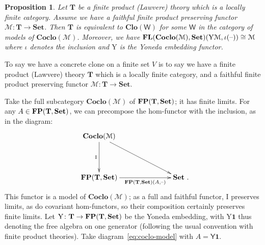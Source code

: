 \documentclass[11pt, a4paper, twoside,leqno]{amsart}
\newcommand{\cat}[1]{\mathbf{#1}}
\newcommand{\thg}{{\mathord{\text{--}}}}
\newcommand{\defeq}{\mathrel{\mathop:}=}
\newcommand{\cd}[2][]{\vcenter{\hbox{\xymatrix#1{#2}}}}
\numberwithin{equation}{section}
\theoremstyle{plain}
\newtheorem{Prop}[Thm]{Proposition}
\theoremstyle{definition}
\newcommand{\Set}{\cat{Set}}
\newcommand{\aone}{{\mathbf 1}}
\DeclareMathOperator{\FP}{\bf FP}
\DeclareMathOperator{\FL}{\bf FL}
\begin{document}
\begin{Prop}
  \label{prop:ct-concr-clo}
  Let \(\cat{T}\) be a finite product (Lawvere) theory which is a
  locally finite category. Assume we have a
faithful finite product preserving functor \(\mathcal{M} \colon
\cat{T} \rightarrow \Set\).
Then \(\cat{T}\) is equivalent to \(\cat{Clo}(\mathsf{W})\) for some
\(\mathsf{W}\) in the category
of models of \(\cat{Coclo}(\mathcal{M})\). Moreover, we have 
\(\FL(\cat{Coclo}(\mathcal{M}),\Set)( \mathrm{Y}
  \mathcal{M}, \iota(\thg)) \cong \mathcal{M}\) where \(\iota\)
  denotes the inclusion and \(\mathrm{Y}
  \) is the Yoneda embedding functor.
\end{Prop}

To say we have a concrete clone on a finite set \(V\) is to say we
have a finite
product (Lawvere) theory \(\cat{T}\) which is a locally finite category, and a
faithful finite product preserving functor \(\mathcal{M} \colon \cat{T} \rightarrow \Set\).

Take
the full subcategory
\( \cat{Coclo}(\mathcal{M})\)
of \(\FP(\cat{T},
\cat{Set})\); it has finite limits. For any \(A \in
\FP(\cat{T},\Set)\), we can precompose
the hom-functor with the inclusion, as in the diagram:
\begin{equation}
  \label{eq:coclo-model}
  \xymatrixcolsep{6pc}
  \xymatrixrowsep{3.5pc}
  \cd{
    {\cat{Coclo}(\mathcal{M})} \ar[d]_-{\mathrm{I}
    } \ar[dr]
    & \\
    {\FP(\cat{T},\Set)} \ar[r]_-{\FP(\cat{T},\Set)(
      A,\thg)
    } & {\Set}
    \rlap{ .}
  }
\end{equation}
This functor is a model of \(\cat{Coclo}(\mathcal{M})\); as a full and faithful functor, \(\mathrm{I}
\) preserves limits, as do covariant
hom-functors, so their composition certainly preserves finite limits.
Let \(\mathrm{Y}
\colon \cat{T} \rightarrow \FP(\cat{T},\Set)\) be the Yoneda
embedding, with \(\mathrm{Y}\aone\) thus denoting the free algebra on
one generator (following the usual convention with finite product
theories). Take diagram~\eqref{eq:coclo-model} with \(A =
\mathsf{Y}\aone\).
\end{document}
